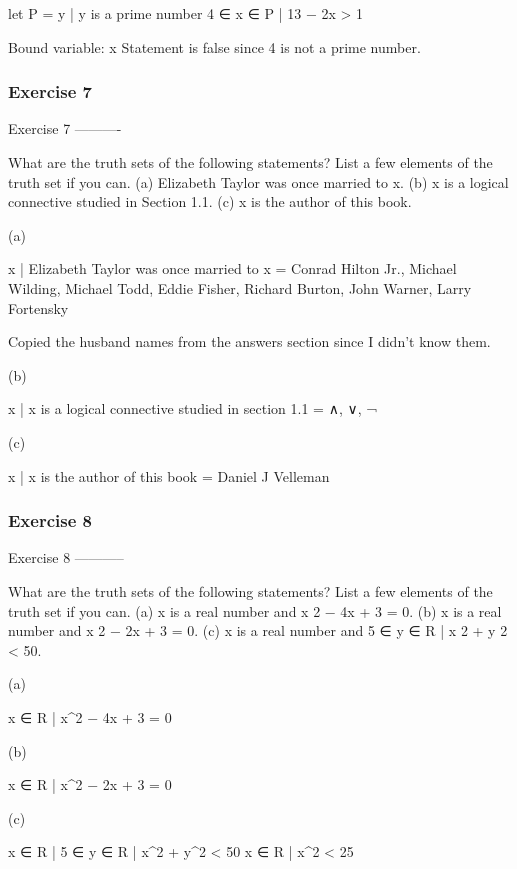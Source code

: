     let P = {y | y is a prime number}
    4 ∈ {x ∈ P | 13 − 2x > 1}

    Bound variable: x
    Statement is false since 4 is not a prime number.

\subsubsection{Exercise 7}
Exercise 7
----------

    What are the truth sets of the following statements? List a few elements of
    the truth set if you can.
    (a) Elizabeth Taylor was once married to x.
    (b) x is a logical connective studied in Section 1.1.
    (c) x is the author of this book.

(a)

    {x | Elizabeth Taylor was once married to x} = {Conrad Hilton Jr.,
    Michael Wilding, Michael Todd, Eddie Fisher, Richard Burton, John
    Warner, Larry Fortensky}

Copied the husband names from the answers section since I didn't know them.

(b)

    {x | x is a logical connective studied in section 1.1} = { ∧, ∨, ¬ }

(c)

    {x | x is the author of this book} = {Daniel J Velleman}

\subsubsection{Exercise 8}
Exercise 8
-----------

    What are the truth sets of the following statements? List a few elements of
    the truth set if you can.
    (a) x is a real number and x 2 − 4x + 3 = 0.
    (b) x is a real number and x 2 − 2x + 3 = 0.
    (c) x is a real number and 5 ∈ {y ∈ R | x 2 + y 2 < 50}.

(a)

    {x ∈ R | x^2 − 4x + 3 = 0}

(b)

    {x ∈ R | x^2 − 2x + 3 = 0}

(c)

    {x ∈ R | 5 ∈ {y ∈ R | x^2 + y^2 < 50}}
    {x ∈ R | x^2 < 25}

